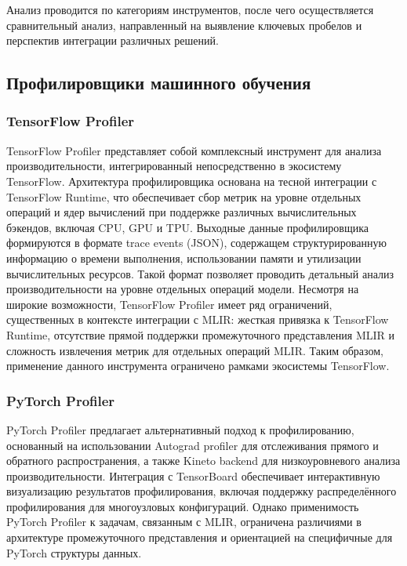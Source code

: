 Анализ проводится по категориям инструментов, после чего осуществляется сравнительный анализ, направленный на выявление ключевых пробелов и перспектив интеграции различных решений.

\subsection{Профилировщики машинного обучения}

\subsubsection{TensorFlow Profiler}
TensorFlow Profiler \cite{tf_profiler} представляет собой комплексный инструмент для анализа производительности, интегрированный непосредственно в экосистему TensorFlow. Архитектура профилировщика основана на тесной интеграции с TensorFlow Runtime, что обеспечивает сбор метрик на уровне отдельных операций и ядер вычислений при поддержке различных вычислительных бэкендов, включая CPU, GPU и TPU. Выходные данные профилировщика формируются в формате trace events (JSON), содержащем структурированную информацию о времени выполнения, использовании памяти и утилизации вычислительных ресурсов.
Такой формат позволяет проводить детальный анализ производительности на уровне отдельных операций модели.
Несмотря на широкие возможности, TensorFlow Profiler имеет ряд ограничений, существенных в контексте интеграции с MLIR: жесткая привязка к TensorFlow Runtime, отсутствие прямой поддержки промежуточного представления MLIR и сложность извлечения метрик для отдельных операций MLIR. Таким образом, применение данного инструмента ограничено рамками экосистемы TensorFlow.

\subsubsection{PyTorch Profiler}
PyTorch Profiler \cite{pytorch_profiler} предлагает альтернативный подход к профилированию, основанный на использовании Autograd profiler для отслеживания прямого и обратного распространения, а также Kineto backend для низкоуровневого анализа производительности. Интеграция с TensorBoard обеспечивает интерактивную визуализацию результатов профилирования, включая поддержку распределённого профилирования для многоузловых конфигураций.
Однако применимость PyTorch Profiler к задачам, связанным с MLIR, ограничена различиями в архитектуре промежуточного представления и ориентацией на специфичные для PyTorch структуры данных.

